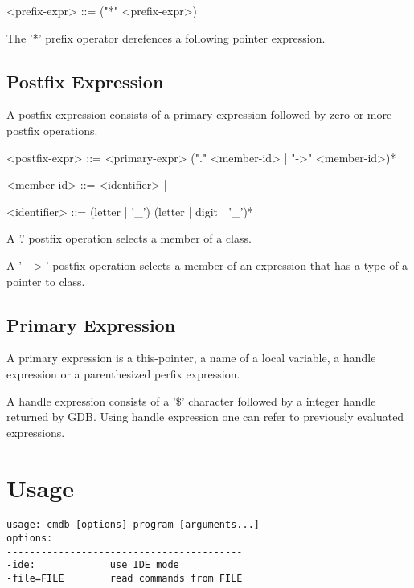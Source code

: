 \documentclass[oneside, a4paper, 11pt]{article}
\begin{document}
\begin{grammar}
<prefix-expr> ::= ("*" <prefix-expr>)
\end{grammar}

The '*' prefix operator derefences a following pointer expression.

\subsection{Postfix Expression}

A postfix expression consists of a primary expression followed by zero or more
postfix operations.

\begin{grammar}
<postfix-expr> ::= <primary-expr> ("." <member-id> | "->" <member-id>)*

<member-id> ::= <identifier> | 

<identifier> ::= (letter | '_') (letter | digit | '_')*
\end{grammar}

A '.' postfix operation selects a member of a class.

A '$->$' postfix operation selects a member of an expression that has a type of a pointer to class.

\subsection{Primary Expression}

A primary expression is a this-pointer, a name of a local variable, a handle expression or a parenthesized perfix expression.


A handle expression consists of a '\$' character followed by a integer handle returned by GDB.
Using handle expression one can refer to previously evaluated expressions.

\section{Usage}

\begin{verbatim}
usage: cmdb [options] program [arguments...]
options:
-----------------------------------------
-ide:             use IDE mode
-file=FILE        read commands from FILE
\end{verbatim}
\end{document}
